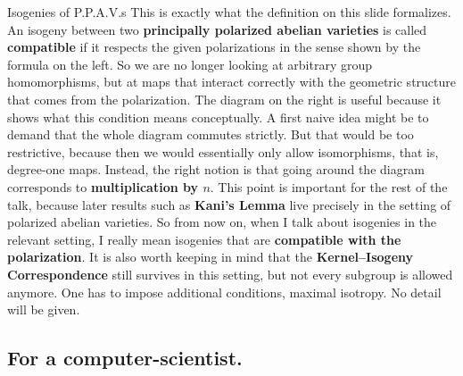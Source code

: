 \documentclass[aspectratio=169,notheorems]{beamer}
\begin{document}
\begin{frame}{Isogenies of P.P.A.V.s}
{			This is exactly what the definition on this slide formalizes. An isogeny between two \textbf{principally polarized abelian varieties} is called \textbf{compatible} if it respects the given polarizations in the sense shown by the formula on the left. So we are no longer looking at arbitrary group homomorphisms, but at maps that interact correctly with the geometric structure that comes from the polarization.
			The diagram on the right is useful because it shows what this condition means conceptually. A first naive idea might be to demand that the whole diagram commutes strictly. But that would be too restrictive, because then we would essentially only allow isomorphisms, that is, degree-one maps. Instead, the right notion is that going around the diagram corresponds to \textbf{multiplication by \(n\)}.
			This point is important for the rest of the talk, because later results such as \textbf{Kani's Lemma} live precisely in the setting of polarized abelian varieties. So from now on, when I talk about isogenies in the relevant setting, I really mean isogenies that are \textbf{compatible with the polarization}.
			It is also worth keeping in mind that the \textbf{Kernel--Isogeny Correspondence} still survives in this setting, but not every subgroup is allowed anymore. One has to impose additional conditions,  maximal isotropy. No detail will be given.
		}
	\end{frame}
	
	\subsection{For a computer-scientist.}
	
\end{document}
